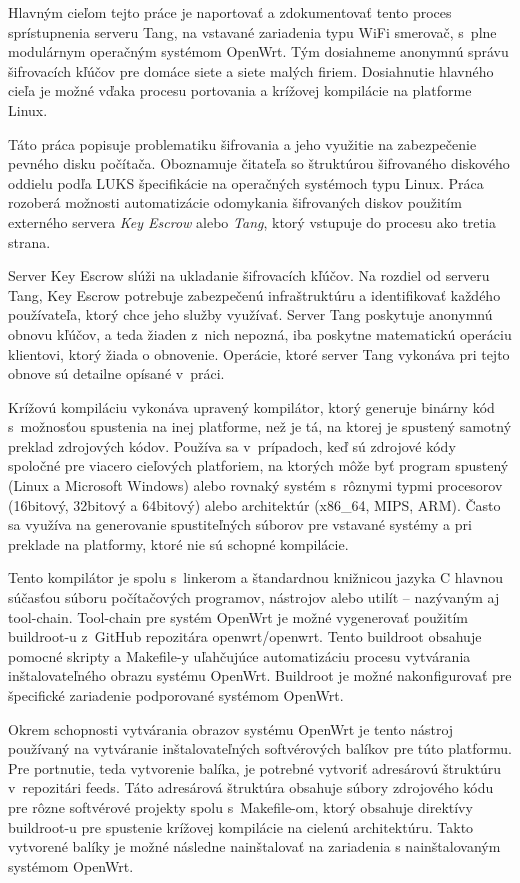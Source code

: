 Hlavným cieľom tejto práce je naportovať a zdokumentovať tento proces sprístupnenia serveru Tang, na vstavané zariadenia typu WiFi smerovač, s~plne modulárnym operačným systémom OpenWrt.
Tým dosiahneme anonymnú správu šifrovacích kľúčov pre domáce siete a siete malých firiem.
Dosiahnutie hlavného cieľa je možné vďaka procesu portovania a krížovej kompilácie na platforme Linux.

Táto práca popisuje problematiku šifrovania a jeho využitie na zabezpečenie pevného disku počítača.
Oboznamuje čitateľa so štruktúrou šifrovaného diskového oddielu podľa LUKS špecifikácie na operačných systémoch typu Linux.
Práca rozoberá možnosti au\-to\-ma\-ti\-zá\-cie odomykania šifrovaných diskov použitím externého servera {\it Key Escrow} alebo {\it Tang}, ktorý vstupuje do procesu ako tretia strana.

Server Key Escrow slúži na ukladanie šifrovacích kľúčov.
Na rozdiel od serveru Tang, Key Escrow potrebuje zabezpečenú infraštruktúru a identifikovať každého používateľa, ktorý chce jeho služby využívať.
Server Tang poskytuje anonymnú obnovu kľúčov, a teda žiaden z~nich nepozná, iba poskytne matematickú operáciu klientovi, ktorý žiada o obnovenie.
Operácie, ktoré server Tang vykonáva pri tejto obnove sú detailne opísané v~práci.

Krížovú kompiláciu vykonáva upravený kompilátor, ktorý generuje binárny kód s mož\-nos\-ťou spustenia na inej platforme, než je tá, na ktorej je spustený samotný preklad zdrojových kódov.
Používa sa v~prípadoch, keď sú zdrojové kódy spoločné pre viacero cieľových platforiem, na ktorých môže byť program spustený (Linux a Microsoft Windows) alebo rovnaký systém s~rôznymi typmi procesorov (16bitový, 32bitový a 64bitový) alebo architektúr (x86\_64, MIPS, ARM).
Často sa využíva na generovanie spustiteľných súborov pre vstavané systémy a pri preklade na platformy, ktoré nie sú schopné kompilácie.

Tento kompilátor je spolu s~linkerom a štandardnou knižnicou jazyka C hlavnou súčasťou súboru počítačových programov, nástrojov alebo utilít -- nazývaným aj tool-chain.
Tool-chain pre systém OpenWrt je možné vygenerovať použitím buildroot-u z~GitHub repozitára openwrt/openwrt.
Tento buildroot obsahuje pomocné skripty a Makefile-y uľahčujúce automatizáciu procesu vytvárania inštalovateľného obrazu systému OpenWrt.
Buildroot je možné nakonfigurovať pre špecifické zariadenie podporované systémom OpenWrt.

Okrem schopnosti vytvárania obrazov systému OpenWrt je tento nástroj používaný na vytváranie inštalovateľných softvérových balíkov pre túto platformu.
Pre portnutie, teda vytvorenie balíka, je potrebné vytvoriť adresárovú štruktúru v~repozitári feeds.
Táto adresárová štruktúra obsahuje súbory zdrojového kódu pre rôzne softvérové projekty spolu s~Makefile-om, ktorý obsahuje direktívy buildroot-u pre spustenie krížovej kompilácie na cielenú architektúru.
Takto vytvorené balíky je možné následne nainštalovať na zariadenia s nainštalovaným systémom OpenWrt.

